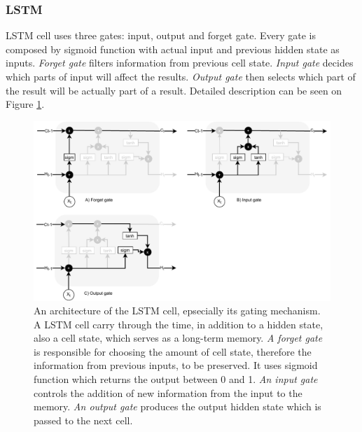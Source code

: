 \subsubsection*{LSTM} LSTM cell uses three gates: input, output and forget gate. Every gate is composed by sigmoid function with actual input and previous hidden state as inputs.
\textit{Forget gate} filters information from previous cell state. \textit{Input gate} decides which parts of input will affect the results. \textit{Output gate} then selects which part of the result will be actually part of a result. Detailed description can be seen on Figure \ref{pic:lstm_gates}.
\begin{figure}[ht]
\centering
\includegraphics[width=1\columnwidth]{../img/lstm_gates}
\protect\caption{An architecture of the LSTM cell, epsecially its gating mechanism. A LSTM cell carry through the time, in addition to a hidden state, also a cell state, which serves as a long-term memory. \textit{A forget gate} is responsible for choosing the amount of cell state, therefore the information from previous inputs, to be preserved. It uses sigmoid function which returns the output between 0 and 1. \textit{An input gate} controls the addition of new information from the input to the memory. \textit{An output gate} produces the output hidden state which is passed to the next cell. }
\label{pic:lstm_gates}
\end{figure}

